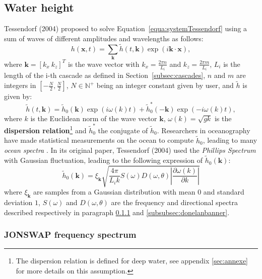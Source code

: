 \documentclass[final]{jcgt}
\begin{document}
\subsection{Water height}
\label{subsec:waterHeight}
Tessendorf (2004) \cite{tessendorfSimulatingOceanWater1999} proposed to solve Equation~\ref{equa:systemTessendorf} using a sum of waves of different amplitudes and wavelengths as follows:
\begin{equation}
	\label{equa:heightWater}
	h(\mathbf x,t)=\sum_{\mathbf{k}} \tilde{h}(t, \mathbf{k}) \exp\left( i \mathbf{k}\cdot \mathbf x\right),
\end{equation}
where $\mathbf{k}=\left[k_x\ k_z\right]^T$ is the wave vector with $k_x=\frac{2\pi n}{L_{i}}$ and $k_z=\frac{2\pi m}{L_{i}}$, $L_i$ is the length of the i-th cascade as defined in Section~\ref{subsec:cascades}, $n$ and $m$ are integers in $\left[-\frac{N}{2},\frac{N}{2}\right]$, $N\in\mathbb N^+$ being an integer constant given by user, and $\tilde{h}$ is given by:
\begin{equation}
	\label{equa:heightWaterBis}
	\tilde{h}(t, \mathbf{k}) = \tilde{h}_0(\mathbf{k})\exp(i\omega(k)t)+\tilde{h}_0^*(-\mathbf{k})\exp(-i\omega(k)t),
\end{equation}
where $k$ is the Euclidean norm of the wave vector $\mathbf{k}$, $\omega(k)=\sqrt{gk}$ is the \textbf{dispersion relation}\footnote{The dispersion relation is defined for deep water, see appendix \ref{sec:annexe} for more details on this assumption.} and $\tilde{h}_0^*$ the conjugate of $\tilde{h}_0$.
Researchers in oceanography have made statistical measurements on the ocean to compute $\tilde{h}_0$, leading to many \textit{ocean spectra} \cite{tessendorfGilliganPrototypeFramework2017}.
In its original paper, Tessendorf (2004) \cite{tessendorfSimulatingOceanWater1999} used the \textit{Phillips Spectrum} with Gaussian fluctuation, leading to the following expression of $\tilde{h}_0(\mathbf{k})$:
\begin{equation}
	\tilde{h}_0(\mathbf{k}) = \xi_{\mathbf{k}}\sqrt{\frac{4\pi}{L_ik}S(\omega)D(\omega, \theta)\left|\frac{\partial\omega(k)}{\partial k}\right|}
\end{equation}
where $\xi_{\mathbf{k}}$ are samples from a Gaussian distribution with mean $0$ and standard deviation $1$, $S(\omega)$ and $D(\omega, \theta)$ are the frequency and directional spectra described respectively in paragraph \ref{subsubsec:jonswap} and \ref{subsubsec:donelanbanner}.

\subsubsection{JONSWAP frequency spectrum}
\label{subsubsec:jonswap}
\end{document}

